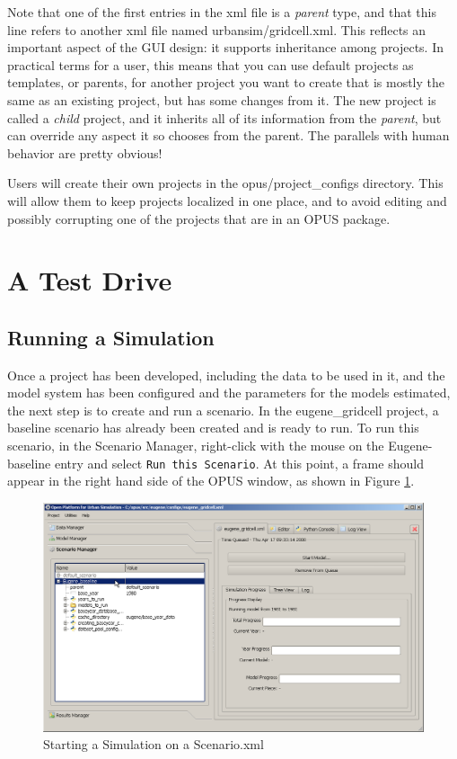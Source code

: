 Note that one of the first entries in the xml file is a \emph{parent} type, and that this line refers to another xml file named urbansim/gridcell.xml.  This reflects an important aspect of the GUI design: it supports inheritance among projects.  In practical terms for a user, this means that you can use default projects as templates, or parents, for another project you want to create that is mostly the same as an existing project, but has some changes from it.  The new project is called a \emph{child} project, and it inherits all of its information from the \emph{parent}, but can override any aspect it so chooses from the parent.  The parallels with human behavior are pretty obvious!

Users will create their own projects in the opus/project\_configs directory.  This will allow them to keep projects localized in one place, and to avoid editing and possibly corrupting one of the projects that are in an OPUS package.

\section{A Test Drive}
\subsection{Running a Simulation}
Once a project has been developed, including the data to be used in it, and the model system has been configured and the parameters for the models estimated, the next step is to create and run a scenario.  In the eugene\_gridcell project, a baseline scenario has already been created and is ready to run.  To run this scenario, in the Scenario Manager, right-click with the mouse on the Eugene-baseline entry and select \verb#Run this Scenario#.  At this point, a frame should appear in the right hand side of the OPUS window, as shown in Figure \ref{fig:opus-start-run}.

\begin{figure}[htp]
\begin{center}
\includegraphics[scale=0.4]{graphics/opus-start-run.png}
\end{center}
\caption{Starting a Simulation on a Scenario.xml}
\label{fig:opus-start-run}
\end{figure}

